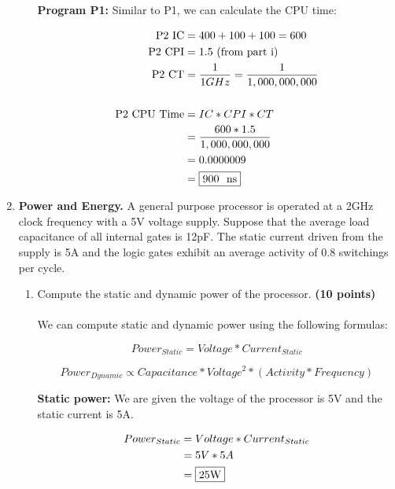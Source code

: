 \documentclass[a4paper, 15pt]{exam}
\begin{document}
\begin{enumerate}
\begin{enumerate}
\textbf{Program P1:} Similar to P1, we can calculate the CPU time:

\begin{align*} 
   			\text{P2 IC} &= 400 + 100 + 100 = 600 \\
   			\text{P2 CPI} &= 1.5 \text{ (from part i)} \\
   			\text{P2 CT} &= \frac{1}{1 GHz} = \frac{1}{1,000,000,000} \\ \\
   			\text{P2 CPU Time} &= IC * CPI * CT \\
   			&= \frac{600 * 1.5}{1,000,000,000} \\
   			&= 0.0000009 \\
   			&= \fbox{900 \ ns}
   	\end{align*}

\end{enumerate}
    \item \textbf{Power and Energy.} A general purpose processor is operated at a 2GHz clock frequency with a 5V voltage supply. Suppose that the average load capacitance of all internal gates is 12pF. The static current driven from the supply is 5A and the logic gates exhibit an average activity of 0.8 switchings per cycle.
    \begin{enumerate}
    \item Compute the static and dynamic power of the processor. \textbf{(10 points)} \\ \\
  We can compute static and dynamic power using the following formulas:
  
  $$Power_{Static} = Voltage * Current_{Static}$$
  
  $$Power_{Dynamic} \propto Capacitance * Voltage^2 * (Activity * Frequency)$$
  
  \textbf{Static power:} We are given the voltage of the processor is 5V and the static current is 5A.
  
  \begin{align*} 
   			Power_{Static} &= Voltage * Current_{Static} \\
   			&= 5V * 5A \\
   			&= \fbox{25W}
   	\end{align*}


\end{enumerate}
\end{enumerate}
\end{document}
